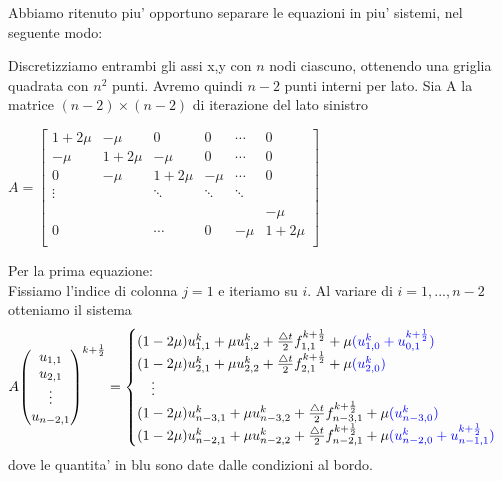 \documentclass[]{article}
\begin{document}
Abbiamo ritenuto piu' opportuno separare le equazioni in piu' sistemi, nel seguente modo:

Discretizziamo entrambi gli assi x,y con $n$ nodi ciascuno, ottenendo una griglia quadrata con $n^2$ punti. Avremo quindi $n-2$ punti interni per lato.
Sia A la matrice $(n-2) \times (n-2)$ di iterazione del lato sinistro
\begin{center}
	$
	A = \begin{bmatrix}
		1+2\mu & -\mu & 0 & 0 & \cdots & 0 \\
		-\mu & 1+2\mu & -\mu & 0 & \cdots & 0\\
		0 & -\mu & 1+2\mu & -\mu & \cdots & 0\\
		\vdots &  & \ddots & \ddots  & \ddots\\
		\\
		& &  &  &   & -\mu\\
		0 &  &  \cdots & 0  & -\mu & 1+2\mu\\ 
	\end{bmatrix}
	$
\end{center}
Per la prima equazione:\\
Fissiamo l'indice di colonna $j = 1$ e iteriamo su $i$. Al variare di $i = 1,...,n-2$  otteniamo il sistema
\begin{equation}
	A {\begin{pmatrix}
	u_{1,1}\\
	u_{2,1}\\
	\vdots\\
	u_{n-2,1}
	\end{pmatrix}}^{k+\frac{1}{2}} = 
	\begin{cases}
	(1-2\mu)u^k_{1,1} + \mu u^k_{1,2} + \frac{\bigtriangleup t}{2} f^{k+\frac{1}{2}}_{1,1} + \mu \color{blue}{(u^k_{1,0} + u^{k+\frac{1}{2}}_{0,1})}\\
	(1-2\mu)u^k_{2,1} + \mu u^k_{2,2} + \frac{\bigtriangleup t}{2} f^{k+\frac{1}{2}}_{2,1} + \mu \color{blue}{(u^k_{2,0})}\\
	\quad \vdots\\
	(1-2\mu)u^k_{n-3,1} + \mu u^k_{n-3,2} + \frac{\bigtriangleup t}{2} f^{k+\frac{1}{2}}_{n-3,1} + \mu \color{blue}{(u^k_{n-3,0})}\\
	(1-2\mu)u^k_{n-2,1} + \mu u^k_{n-2,2} + \frac{\bigtriangleup t}{2} f^{k+\frac{1}{2}}_{n-2,1} + \mu \color{blue}{(u^k_{n-2,0} + u^{k+\frac{1}{2}}_{n-1,1})}\\
	\end{cases}
\end{equation}
dove le quantita' in blu sono date dalle condizioni al bordo.
\end{document}
